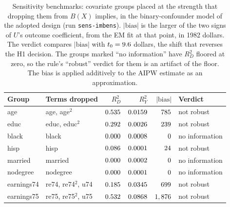 \documentclass[11pt]{article}
\newcommand{\run}[1]{\texttt{#1}}
\begin{document}
\begin{table}[tbp]
\centering
\caption{Sensitivity benchmarks: covariate groups placed at the strength that dropping them
from $B(X)$ implies, in the binary-confounder model of the adopted design (run
\run{sens-imbens}). $|\text{bias}|$ is the larger of the two signs of $U$'s outcome
coefficient, from the EM fit at that point, in 1982 dollars. The verdict compares
$|\text{bias}|$ with $t_0 = 9.6$ dollars, the shift that reverses the H1
decision. The groups marked ``no information'' have $R^2_D$ floored at zero, so the rule's
``robust'' verdict for them is an artifact of the floor. The bias is applied additively to
the AIPW estimate as an approximation.}
\label{tab:sens}
\small
\begin{tabular}{@{}l l r r r l@{}}
\toprule
Group & Terms dropped & $R^2_D$ & $R^2_Y$ & $|\text{bias}|$ & Verdict \\
\midrule
age & age, age$^2$ & $0.535$ & $0.0159$ & $785$ & not robust \\
educ & educ, educ$^2$ & $0.292$ & $0.0026$ & $239$ & not robust \\
black & black & $0.000$ & $0.0008$ & $0$ & no information \\
hisp & hisp & $0.086$ & $0.0001$ & $24$ & not robust \\
married & married & $0.000$ & $0.0002$ & $0$ & no information \\
nodegree & nodegree & $0.000$ & $0.0001$ & $0$ & no information \\
earnings74 & re74, re74$^2$, u74 & $0.185$ & $0.0345$ & $699$ & not robust \\
earnings75 & re75, re75$^2$, u75 & $0.532$ & $0.0868$ & $1,876$ & not robust \\
\bottomrule
\end{tabular}
\end{table}
\end{document}
